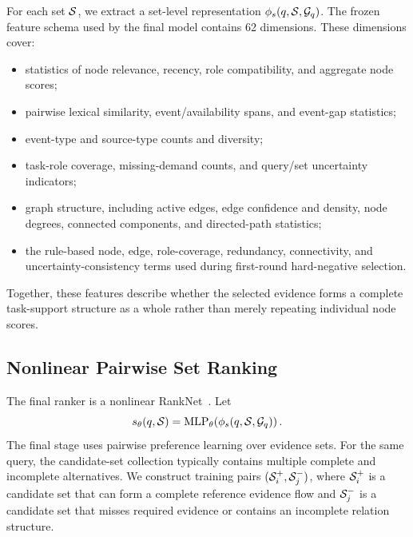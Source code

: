 For each set $\mathcal{S}$, we extract a set-level representation $\phi_s(q,\mathcal{S},\mathcal{G}_q)$. The frozen feature schema used by the final model contains 62 dimensions.
These dimensions cover:
\begin{itemize}
    \item statistics of node relevance, recency, role compatibility, and aggregate node scores;
    \item pairwise lexical similarity, event/availability spans, and event-gap statistics;
    \item event-type and source-type counts and diversity;
    \item task-role coverage, missing-demand counts, and query/set uncertainty indicators;
    \item graph structure, including active edges, edge confidence and density, node degrees, connected components, and directed-path statistics;
    \item the rule-based node, edge, role-coverage, redundancy, connectivity, and uncertainty-consistency terms used during first-round hard-negative selection.
\end{itemize}
Together, these features describe whether the selected evidence forms a complete task-support structure as a whole rather than merely repeating individual node scores.

\subsection{Nonlinear Pairwise Set Ranking}

The final ranker is a nonlinear RankNet~\cite{burges2005ranknet}. Let
\begin{equation}
s_{\theta}(q,\mathcal{S})
=
\operatorname{MLP}_{\theta}
\!\left(
\phi_s(q,\mathcal{S},\mathcal{G}_q)
\right).
\end{equation}
The final stage uses pairwise preference learning over evidence sets. For the same query, the candidate-set collection typically contains multiple complete and incomplete alternatives. We construct training pairs
$(\mathcal{S}_i^+,\mathcal{S}_j^-)$,
where $\mathcal{S}_i^+$ is a candidate set that can form a complete reference evidence flow and $\mathcal{S}_j^-$ is a candidate set that misses required evidence or contains an incomplete relation structure.

